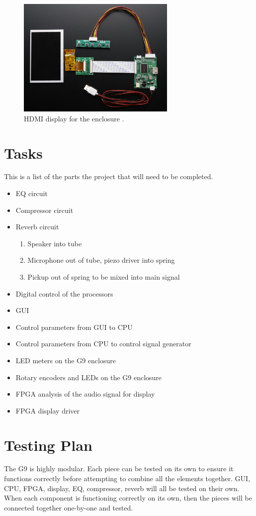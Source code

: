 \documentclass[journal]{IEEEtran}
\begin{document}
	
	\begin{figure}
		\centering
		\includegraphics[width=3in]{hdmiDisplay}
		\caption{HDMI display for the enclosure \cite{hdmiDisplay}. }
		\label{fig:hdmiDisplay}
	\end{figure}
	
	\section{Tasks}
	This is a list of the parts the project that will need to be completed.
	
	\begin{itemize}  
		\item EQ circuit 
		\item Compressor circuit
		\item Reverb circuit
		\begin{enumerate}
			\item Speaker into tube
			\item Microphone out of tube, piezo driver into spring
			\item Pickup out of spring to be mixed into main signal
		\end{enumerate}
		\item Digital control of the processors
		\item GUI
		\item Control parameters from GUI to CPU
		\item Control parameters from CPU to control signal generator
		\item LED meters on the G9 enclosure
		\item Rotary encoders and LEDs on the G9 enclosure
		\item FPGA analysis of the audio signal for display
		\item FPGA display driver
	\end{itemize}
	
	
	\section{Testing Plan}
	The G9 is highly modular. Each piece can be tested on its own to ensure it functions correctly before attempting to combine all the elements together. GUI, CPU, FPGA, display, EQ, compressor, reverb will all be tested on their own. When each component is functioning correctly on its own, then the pieces will be connected together one-by-one and tested.
	
\end{document}
